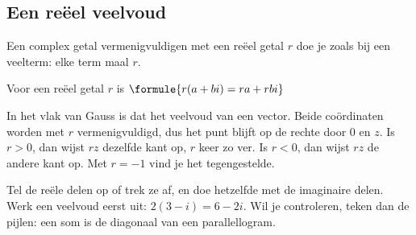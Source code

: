 \subsection{Een reëel veelvoud}

Een complex getal vermenigvuldigen met een reëel getal $r$ doe je zoals bij een veelterm: elke term maal $r$.

\begin{theorie}
Voor een reëel getal $r$ is \quad $\formule{r(a + bi) = ra + rbi}$
\end{theorie}

In het vlak van Gauss is dat het veelvoud van een vector. Beide coördinaten worden met $r$ vermenigvuldigd, dus het punt blijft op de rechte door 0 en $z$. Is $r > 0$, dan wijst $rz$ dezelfde kant op, $r$ keer zo ver. Is $r < 0$, dan wijst $rz$ de andere kant op. Met $r = -1$ vind je het tegengestelde.


\begin{werkwijze}
Tel de reële delen op of trek ze af, en doe hetzelfde met de imaginaire delen. Werk een veelvoud eerst uit: $2(3 - i) = 6 - 2i$. Wil je controleren, teken dan de pijlen: een som is de diagonaal van een parallellogram.
\end{werkwijze}

